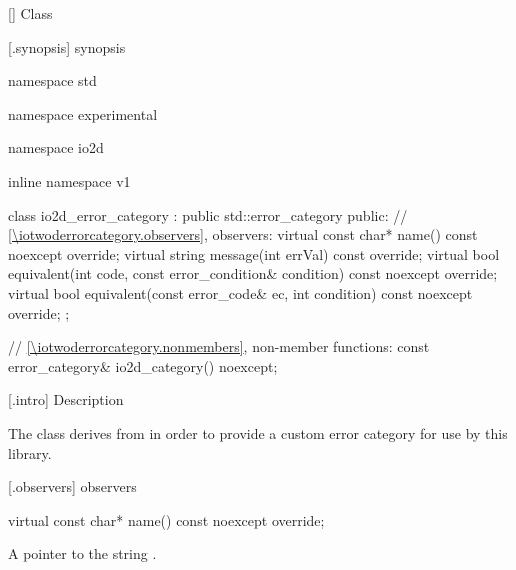  [\iotwoderrorcategory] {Class }

 [\iotwoderrorcategory.synopsis] { 
synopsis}

\begin{codeblock}
namespace std { namespace experimental { namespace io2d { inline namespace v1 {
  class io2d_error_category : public std::error_category {
  public:
    // \ref{\iotwoderrorcategory.observers}, observers:
    virtual const char* name() const noexcept override;
    virtual string message(int errVal) const override;
    virtual bool equivalent(int code,
      const error_condition& condition) const noexcept override;
    virtual bool equivalent(const error_code& ec,
      int condition) const noexcept override;
  };
  
  // \ref{\iotwoderrorcategory.nonmembers}, non-member functions:
  const error_category& io2d_category() noexcept;
} } } }
\end{codeblock}

 [\iotwoderrorcategory.intro] { 
Description}

\pnum
{}
The  class derives from 
 in order to provide a custom error category for 
use by this library.

 [\iotwoderrorcategory.observers] { 
observers}

\begin{itemdecl}
virtual const char* name() const noexcept override;
\end{itemdecl}
\begin{itemdescr}
	\pnum
	\returns
	A pointer to the string .
\end{itemdescr}

